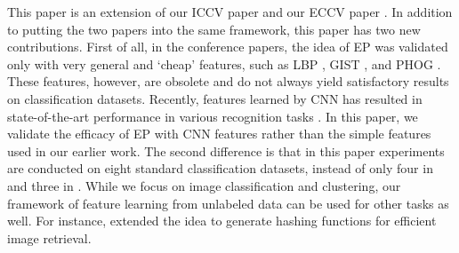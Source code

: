 This paper is an extension of our ICCV paper \citep{dai:iccv13b} and
our ECCV paper \citep{dai:eccv12b}. In addition to putting the two
papers into the same framework, this paper has two new
contributions. First of all, in the conference papers, the idea of EP
was validated only with very general and `cheap' features, such as LBP
\citep{Ojala02}, GIST \citep{gist}, and PHOG
\citep{Bosch:iccv07}. These features, however, are obsolete and do
not always yield satisfactory results on classification
datasets. Recently, features learned by CNN has resulted in
state-of-the-art performance in various recognition tasks
\citep{nips12:cnn, caffe14, rich:feature:cvpr14, deep:bmvc14}. In this
paper, we validate the efficacy of EP with CNN features rather than
the simple features used in our earlier work. The second difference is that in this
paper experiments are conducted on eight standard classification
datasets, instead of only four in \citep{dai:iccv13b} and three in
\citep{dai:eccv12b}.  While we focus on image classification and
clustering, our framework of feature learning from unlabeled data can
be used for other tasks as well. For instance, 
\citet{random:hashing} extended the idea to generate hashing functions
for efficient image retrieval.

